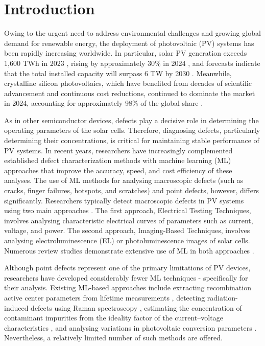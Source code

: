 \documentclass[10pt]{iopart}
\begin{document}
\ioptwocol
%


\section{Introduction}\label{sec:Int}

Owing to the urgent need to address environmental challenges and growing global demand for renewable energy, the deployment of photovoltaic (PV) systems has been rapidly increasing worldwide.
In particular, solar PV generation exceeds 1,600 TWh in 2023 \cite{IEA2024Renewables, OSAMA2025}, rising by approximately 30\% in 2024 \cite{Prometheus2025}, and forecasts indicate that the
total installed capacity will surpass 6 TW by 2030 \cite{IEA2024Renewables}.
Meanwhile, crystalline silicon photovoltaics, which have benefited from decades of scientific advancement and continuous cost reductions, continued to dominate the market in 2024, accounting for approximately 98\% of the global share \cite{Fischer2025ITRPV, THOME2025}.

As in other semiconductor devices, defects play a decisive role in determining the operating parameters of the solar cells.
Therefore, diagnosing defects, particularly determining their concentrations, is critical for maintaining stable performance of PV systems.
In recent years, researchers have increasingly complemented established defect characterization methods with machine learning (ML) approaches that improve the accuracy, speed,
and cost efficiency of these analyses.
The use of ML methods for analysing macroscopic defects (such as cracks, finger failures, hotspots, and scratches) and point defects, however, differs significantly.
Researchers typically detect macroscopic defects in PV systems using two main approaches \cite{Jia2024, Hijjawi2023}.
The first approach, Electrical Testing Techniques, involves analysing characteristic electrical curves of parameters such as current, voltage, and power.
The second approach, Imaging-Based Techniques, involves analysing electroluminescence (EL) \cite{Liu2024a} or photoluminescence \cite{Doll2021} images of solar cells.
Numerous review studies demonstrate extensive use of ML in both approaches \cite{Datta2023, Jaiswal2023, Buratti2024, MAHDAVIPOUR, Hopwood2020, Li2021, Liu2021}.

Although point defects represent one of the primary limitations of PV devices, researchers have developed considerably fewer ML techniques - specifically for their analysis.
Existing ML-based approaches include extracting recombination active center parameters from lifetime measurements \cite{Wang2024a, Buratti2022, Buratti2020a},
detecting radiation-induced defects using Raman spectroscopy \cite{Park2022, Chia2024},
estimating the concentration of contaminant impurities from the ideality factor of the current–voltage characteristics \cite{Olikh2022PPV},
and analysing variations in photovoltaic conversion parameters \cite{Olikh2025SE}.
Nevertheless, a relatively limited number of such methods are offered.
\end{document}
